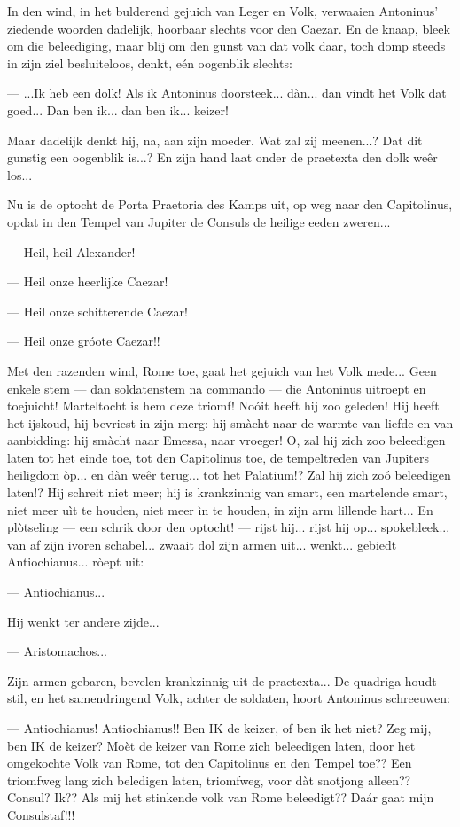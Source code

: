 \documentclass[a4paper, 12pt, oneside, dutch]{article}
\begin{document}
In den wind, in het bulderend gejuich van Leger en Volk, verwaaien Antoninus' ziedende woorden dadelijk, hoorbaar slechts voor den Caezar. En de knaap, bleek om die beleediging, maar blij om den gunst van dat volk daar, toch domp steeds in zijn ziel besluiteloos, denkt, eén oogenblik slechts:

--- ...Ik heb een dolk! Als ik Antoninus doorsteek... dàn... dan vindt het Volk dat goed... Dan ben ik... dan ben ik... keizer!

Maar dadelijk denkt hij, na, aan zijn moeder. Wat zal zij meenen...? Dat dit gunstig een oogenblik is...? En zijn hand laat onder de praetexta den dolk weêr los...

Nu is de optocht de Porta Praetoria des Kamps uit, op weg naar den Capitolinus, opdat in den Tempel van Jupiter de Consuls de heilige eeden zweren...

--- Heil, heil Alexander!

--- Heil onze heerlijke Caezar!

--- Heil onze schitterende Caezar!

--- Heil onze gróote Caezar!!

Met den razenden wind, Rome toe, gaat het gejuich van het Volk mede... Geen enkele stem --- dan soldatenstem na commando --- die Antoninus uitroept en toejuicht! Marteltocht is hem deze triomf! Noóit heeft hij zoo geleden! Hij heeft het ijskoud, hij bevriest in zijn merg: hij smàcht naar de warmte van liefde en van aanbidding: hij smàcht naar Emessa, naar vroeger! O, zal hij zich zoo beleedigen laten tot het einde toe, tot den Capitolinus toe, de tempeltreden van Jupiters heiligdom òp... en dàn weêr terug... tot het Palatium!? Zal hij zich zoó beleedigen laten!? Hij schreit niet meer; hij is krankzinnig van smart, een martelende smart, niet meer uìt te houden, niet meer ìn te houden, in zijn arm lillende hart... En plòtseling --- een schrik door den optocht! --- rijst hij... rijst hij op... spokebleek... van af zijn ivoren schabel... zwaait dol zijn armen uit... wenkt... gebiedt Antiochianus... ròept uit:

--- Antiochianus...

Hij wenkt ter andere zijde...

--- Aristomachos...

Zijn armen gebaren, bevelen krankzinnig uit de praetexta... De quadriga houdt stil, en het samendringend Volk, achter de soldaten, hoort Antoninus schreeuwen:

--- Antiochianus! Antiochianus!! Ben IK de keizer, of ben ik het niet? Zeg mij, ben IK de keizer? Moèt de keizer van Rome zich beleedigen laten, door het omgekochte Volk van Rome, tot den Capitolinus en den Tempel toe?? Een triomfweg lang zich beledigen laten, triomfweg, voor dàt snotjong alleen?? Consul? Ik?? Als mij het stinkende volk van Rome beleedigt?? Daár gaat mijn Consulstaf!!!
\end{document}
